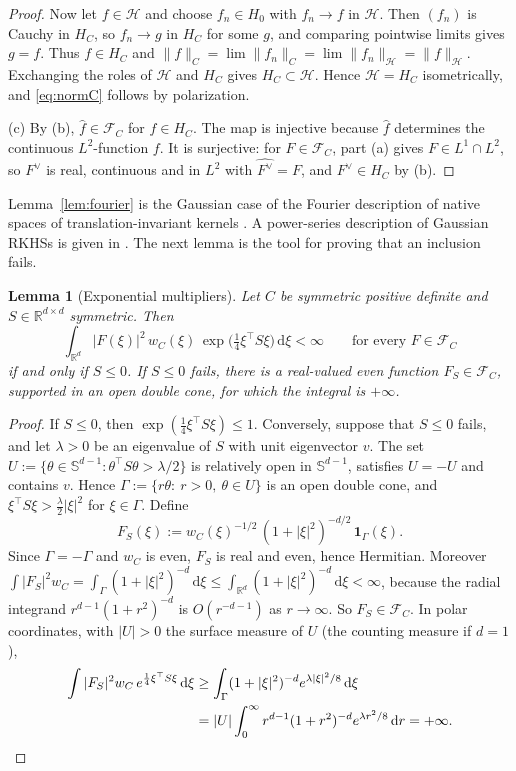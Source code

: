 \documentclass[11pt]{amsart}
\numberwithin{equation}{section}
\newtheorem{lemma}[theorem]{Lemma}
\theoremstyle{definition}
\theoremstyle{remark}
\newcommand{\R}{\mathbb{R}}
\newcommand{\Sph}{\mathbb{S}}
\newcommand{\dd}{\,\mathrm{d}}
\newcommand{\FC}[1]{\mathcal{F}_{#1}}
\newcommand{\hatf}[1]{\widehat{#1}}
\newcommand{\tp}{\top}
\begin{document}
\begin{proof}
Now let $f\in\mathcal H$ and choose $f_n\in H_0$ with $f_n\to f$ in $\mathcal H$. Then $(f_n)$ is Cauchy in $H_C$, so
$f_n\to g$ in $H_C$ for some $g$, and comparing pointwise limits gives $g=f$. Thus $f\in H_C$ and
$\|f\|_C=\lim\|f_n\|_C=\lim\|f_n\|_{\mathcal H}=\|f\|_{\mathcal H}$. Exchanging the roles of $\mathcal H$ and $H_C$
gives $H_C\subset\mathcal H$. Hence $\mathcal H=H_C$ isometrically, and \eqref{eq:normC} follows by polarization.

(c) By (b), $\hatf f\in\FC{C}$ for $f\in H_C$. The map is injective because $\hatf f$ determines the continuous
$L^2$-function $f$. It is surjective: for $F\in\FC{C}$, part (a) gives $F\in L^1\cap L^2$, so $F^\vee$ is real,
continuous and in $L^2$ with $\hatf{F^\vee}=F$, and $F^\vee\in H_C$ by (b).
\end{proof}

Lemma~\ref{lem:fourier} is the Gaussian case of the Fourier description of native spaces of translation-invariant
kernels \cite[Theorem~10.12]{Wendland}. A power-series description of Gaussian RKHSs is given in \cite{SHS}. The next
lemma is the tool for proving that an inclusion fails.

\begin{lemma}[Exponential multipliers]\label{lem:multiplier}
Let $C$ be symmetric positive definite and $S\in\R^{d\times d}$ symmetric. Then
\[
\int_{\R^d}|F(\xi)|^2\,w_C(\xi)\,\exp\bigl(\tfrac14\xi^\tp S\xi\bigr)\dd\xi<\infty\qquad\text{for every }F\in\FC{C}
\]
if and only if $S\le0$. If $S\le0$ fails, there is a real-valued even function $F_S\in\FC{C}$, supported in an open
double cone, for which the integral is $+\infty$.
\end{lemma}

\begin{proof}
If $S\le0$, then $\exp(\frac14\xi^\tp S\xi)\le1$. Conversely, suppose that $S\le0$ fails, and let $\lambda>0$ be an
eigenvalue of $S$ with unit eigenvector $v$. The set $U:=\{\theta\in\Sph^{d-1}:\theta^\tp S\theta>\lambda/2\}$ is relatively open
in $\Sph^{d-1}$, satisfies $U=-U$ and contains $v$. Hence $\Gamma:=\{r\theta:\ r>0,\ \theta\in U\}$ is an open double
cone, and $\xi^\tp S\xi>\frac\lambda2|\xi|^2$ for $\xi\in\Gamma$. Define
\[
F_S(\xi):=w_C(\xi)^{-1/2}\,(1+|\xi|^2)^{-d/2}\,\mathbf 1_\Gamma(\xi).
\]
Since $\Gamma=-\Gamma$ and $w_C$ is even, $F_S$ is real and even, hence Hermitian. Moreover
$\int|F_S|^2w_C=\int_\Gamma(1+|\xi|^2)^{-d}\dd\xi\le\int_{\R^d}(1+|\xi|^2)^{-d}\dd\xi<\infty$, because the radial
integrand $r^{d-1}(1+r^2)^{-d}$ is $O(r^{-d-1})$ as $r\to\infty$. So $F_S\in\FC{C}$. In polar coordinates, with $|U|>0$
the surface measure of $U$ (the counting measure if $d=1$),
\begin{align*}
\int|F_S|^2w_C\,e^{\frac14\xi^\tp S\xi}\dd\xi
&\ge\int_\Gamma(1+|\xi|^2)^{-d}e^{\lambda|\xi|^2/8}\dd\xi\\
&=|U|\int_0^\infty r^{d-1}(1+r^2)^{-d}e^{\lambda r^2/8}\dd r=+\infty. \qedhere
\end{align*}
\end{proof}
\end{document}
